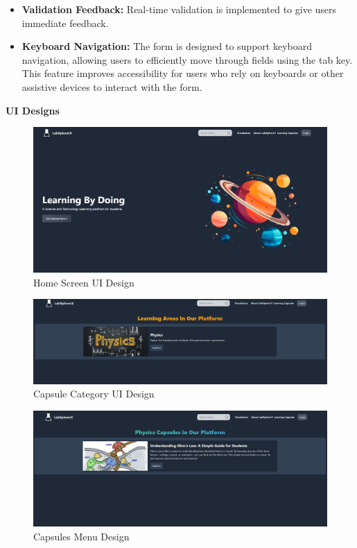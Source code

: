 \begin{itemize}
\begin{itemize}
        \item \textbf{Validation Feedback:} 
        Real-time validation is implemented to give users immediate feedback. 
        
        \item \textbf{Keyboard Navigation:} 
        The form is designed to support keyboard navigation, allowing users to efficiently move through fields using the tab key. This feature improves accessibility for users who rely on keyboards or other assistive devices to interact with the form.
    \end{itemize}
    
\end{itemize}
\textbf{UI Designs}
\begin{figure}[H]
   \centering
    \includegraphics[width = 15cm]{Diagrams/interface/home ui.png}
    \caption{Home Screen UI Design}
\end{figure}
\begin{figure}[H]
    \centering
     \includegraphics[width = 15cm]{Diagrams/interface/capsule category ui.png}
     \caption{Capsule Category UI Design}
 \end{figure}
 \begin{figure}[H]
    \centering
     \includegraphics[width = 15cm]{Diagrams/interface/Capsules.png}
     \caption{Capsules Menu Design}
 \end{figure}
